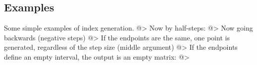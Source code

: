 \subsection{Examples}

Some simple examples of index generation.
@>
Now by half-steps:
@>
Now going backwards (negative steps)
@>
If the endpoints are the same, one point is generated, regardless of the step size (middle argument)
@>
If the endpoints define an empty interval, the output is an empty matrix:
@>
